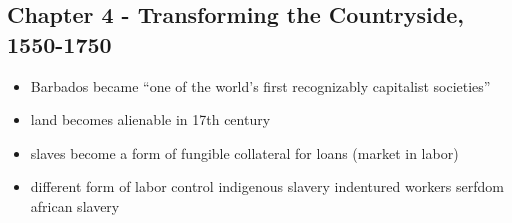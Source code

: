 \documentclass[a4paper,12pt]{article}
\begin{document}
\subsection{Chapter 4 - Transforming the Countryside, 1550-1750}

\begin{itemize}

\item Barbados became ``one of the world's first recognizably capitalist societies''

\item land becomes alienable in 17th century

\item slaves become a form of fungible collateral for loans (market in labor)

\item different form of labor control
	\subitem indigenous slavery
	\subitem indentured workers
	\subitem serfdom
	\subitem african slavery

\end{itemize}
\end{document}
